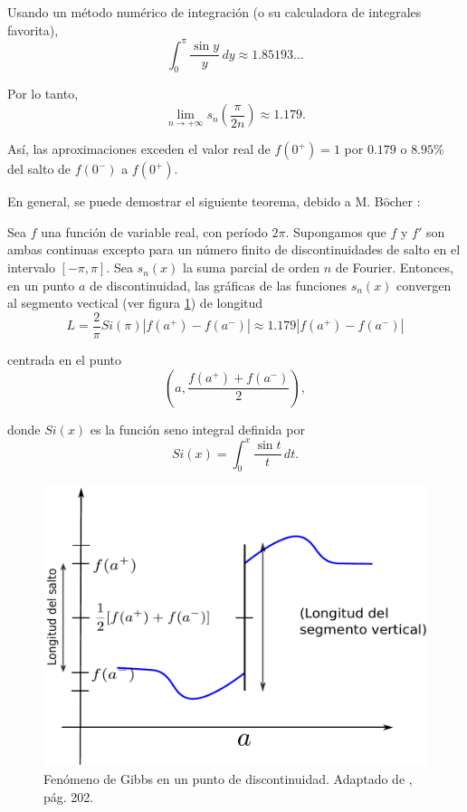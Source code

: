 Usando un método numérico de integración (o su calculadora de integrales favorita), 
$$\int_0^{\pi} \frac{\sin y}{y} \,dy \approx 1.85193\dots$$

Por lo tanto, 
$$\lim_{n \to + \infty} s_n\left( \frac{\pi}{2n} \right) \approx 1.179.$$

Así, las aproximaciones exceden el valor real de $f(0^+) = 1$ por $0.179$ o $8.95\%$ del salto de $f(0^-)$ a $f(0^+)$. 

En general, se puede demostrar el siguiente teorema, debido a M. B$\hat{\mbox{o}}$cher \cite{Bôcher}:

\begin{teorema}
Sea $f$ una función de variable real, con período $2\pi$. Supongamos que $f$ y $f'$ son ambas continuas excepto para un número finito de discontinuidades de salto en el intervalo $[-\pi,\pi]$. Sea $s_n(x)$ la suma parcial de orden $n$ de Fourier. Entonces, en un punto $a$ de discontinuidad, las gráficas de las funciones $s_n(x)$ convergen al segmento vectical (ver figura \ref{Gibbs}) de longitud 
$$L = \frac{2}{\pi} Si(\pi) |f(a^+) - f(a^-)| \approx 1.179 |f(a^+) - f(a^-)|$$

centrada en el punto 
$$\left(a, \frac{f(a^+) + f(a^-)}{2} \right),$$

donde $Si(x)$ es la función seno integral definida por
$$Si(x) = \int_0^x \frac{\sin t}{t} \,dt.$$
\end{teorema}

\begin{figure}[H]
    \centering
    \includegraphics[scale = 0.51]{Figuras/Gibbs.pdf}
    \caption{Fenómeno de Gibbs en un punto de discontinuidad. Adaptado de \cite{UFRO}, pág. 202.}
    \label{Gibbs}
\end{figure}
 
